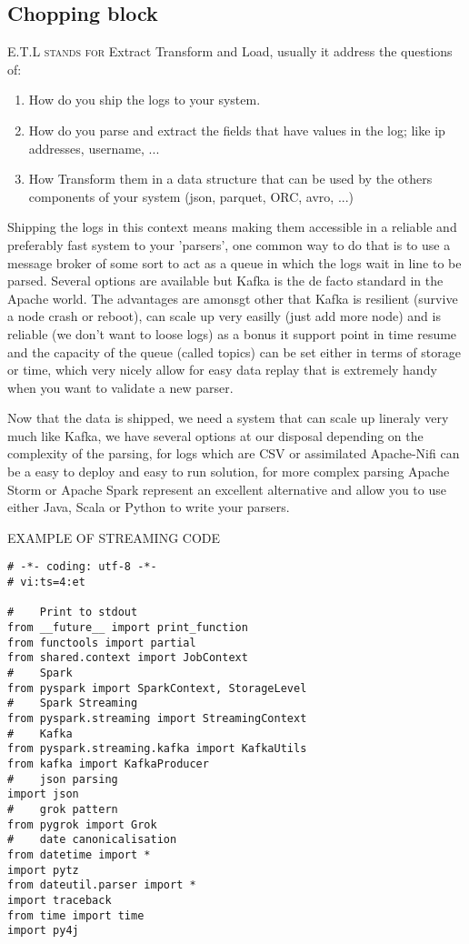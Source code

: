 \documentclass[a4paper,12pt]{article}
\begin{document}
{\subsection{Chopping block}
\lettrine{E.T.L}{ stands for} Extract Transform and Load, usually it address the questions of:
\begin{enumerate}
	\item How do you ship the logs to your system.
	\item How do you parse and extract the fields that have values in the log; like ip addresses, username, ...
	\item How Transform them in a data structure that can be used by the others components of your system (json, parquet, ORC, avro, ...)
\end{enumerate}
Shipping the logs in this context means making them accessible in a reliable and preferably fast system to your 'parsers', one common way to do that is to use a 
message broker of some sort to act as a queue in which the logs wait in line to be parsed.
Several options are available but Kafka is the de facto standard in the Apache world.
The advantages are amonsgt other that Kafka is resilient (survive a node crash or reboot), can scale up very easilly (just add more node) and is reliable (we don't want to loose logs) as a bonus 
it support point in time resume and the capacity of the queue (called topics) can be set either in terms of storage or time, which very nicely allow for easy data replay that is extremely handy when you want to validate a new parser.

Now that the data is shipped, we need a system that can scale up lineraly very much like Kafka, we have several options at our disposal depending on the complexity of the parsing, for logs which are CSV or assimilated Apache-Nifi can be a easy to deploy and easy to run solution,
for more complex parsing Apache Storm or Apache Spark represent an excellent alternative and allow you to use either Java, Scala or Python to write your parsers.

EXAMPLE OF STREAMING CODE
\begin{lstlisting}
# -*- coding: utf-8 -*-
# vi:ts=4:et

#    Print to stdout
from __future__ import print_function
from functools import partial
from shared.context import JobContext
#    Spark
from pyspark import SparkContext, StorageLevel
#    Spark Streaming
from pyspark.streaming import StreamingContext
#    Kafka
from pyspark.streaming.kafka import KafkaUtils
from kafka import KafkaProducer
#    json parsing
import json
#    grok pattern
from pygrok import Grok
#    date canonicalisation
from datetime import *
import pytz
from dateutil.parser import *
import traceback
from time import time
import py4j


\end{lstlisting}}
\end{document}
